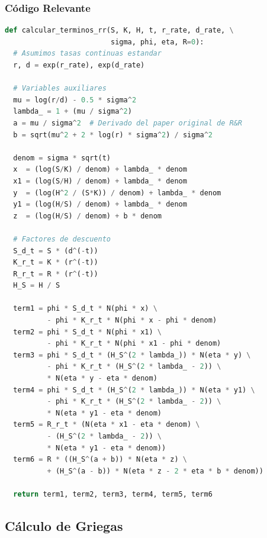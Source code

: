 \subsubsection{Código Relevante}

\begin{lstlisting}[language=Python, caption={Términos de RR}, label={lst:rr_example}]
def calcular_terminos_rr(S, K, H, t, r_rate, d_rate, \
                         sigma, phi, eta, R=0):
  # Asumimos tasas continuas estandar
  r, d = exp(r_rate), exp(d_rate)
  
  # Variables auxiliares
  mu = log(r/d) - 0.5 * sigma^2
  lambda_ = 1 + (mu / sigma^2)
  a = mu / sigma^2  # Derivado del paper original de R&R
  b = sqrt(mu^2 + 2 * log(r) * sigma^2) / sigma^2
  
  denom = sigma * sqrt(t)
  x  = (log(S/K) / denom) + lambda_ * denom
  x1 = (log(S/H) / denom) + lambda_ * denom
  y  = (log(H^2 / (S*K)) / denom) + lambda_ * denom
  y1 = (log(H/S) / denom) + lambda_ * denom
  z  = (log(H/S) / denom) + b * denom
    
  # Factores de descuento
  S_d_t = S * (d^(-t))
  K_r_t = K * (r^(-t))
  R_r_t = R * (r^(-t))
  H_S = H / S
  
  term1 = phi * S_d_t * N(phi * x) \
          - phi * K_r_t * N(phi * x - phi * denom)
  term2 = phi * S_d_t * N(phi * x1) \
          - phi * K_r_t * N(phi * x1 - phi * denom)
  term3 = phi * S_d_t * (H_S^(2 * lambda_)) * N(eta * y) \
          - phi * K_r_t * (H_S^(2 * lambda_ - 2)) \
          * N(eta * y - eta * denom)
  term4 = phi * S_d_t * (H_S^(2 * lambda_)) * N(eta * y1) \
          - phi * K_r_t * (H_S^(2 * lambda_ - 2)) \
          * N(eta * y1 - eta * denom)
  term5 = R_r_t * (N(eta * x1 - eta * denom) \
          - (H_S^(2 * lambda_ - 2)) \
          * N(eta * y1 - eta * denom))
  term6 = R * ((H_S^(a + b)) * N(eta * z) \
          + (H_S^(a - b)) * N(eta * z - 2 * eta * b * denom))
          
  return term1, term2, term3, term4, term5, term6
\end{lstlisting}

\subsection{Cálculo de Griegas}
\label{subsec:griegas_rr}

